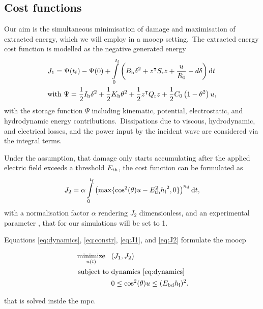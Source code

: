 \subsection{Cost functions}
Our aim is the simultaneous minimisation of damage and maximisation of extracted energy, which we will employ in a \ac{moocp} setting.\ 
The extracted energy cost function is modelled as the negative generated energy
\begin{equation}\label{eq:J1}
	\begin{split}
		& J_1 = \Psi(\tf)-\Psi(0) +\int_0^{\tf} \left(B_\mathrm{h}\delta^2 +z^\intercal S_\mathrm{r} z +\dfrac{u}{R_0} - d \delta\right) \text{d}t \\
		& \text{with}\ \Psi = \dfrac{1}{2}I_\mathrm{h}\delta^2+\dfrac{1}{2}K_\mathrm{h}{\theta}^2+ \dfrac{1}{2}z^\intercal Q_\mathrm{r} z + \dfrac{1}{2} C_0\left(1 - \theta^2 \right) u,
	\end{split}
\end{equation}
with the storage function $\Psi$ including kinematic, potential, electrostatic, and hydrodynamic energy contributions.\ 
Dissipations due to viscous, hydrodynamic, and electrical losses, and the power input by the incident wave are considered via the integral terms.\ 

Under the assumption, that damage only starts accumulating after the applied electric field exceeds a threshold $E_\mathrm{th}$, the cost function can be formulated as
\begin{equation}\label{eq:J2}
	J_2 = \alpha \int_0^{\tf} \left(\max \{ \cos^2(\theta)u-\Eth^2 {\hl}^2,0 \} \right)^{\nd} \text{d}t, 
\end{equation}
with a normalisation factor $\alpha$ rendering $J_2$ dimensionless, and an experimental parameter \nd, that for our simulations will be set to 1.\ 
\ 

Equations \eqref{eq:dynamics}, \eqref{eq:constr}, \eqref{eq:J1}, and \eqref{eq:J2} formulate the \ac{moocp}

\begin{problem}\label{prob:ocp}
	\begin{align}\label{eq:problem}
	\operatorname*{minimize}_{u(t)} \ \ \, &(J_1, J_2) \nonumber\\
	\ \text{subject to} \ &\text{dynamics}\ \eqref{eq:dynamics} \nonumber\\
	&0 \le \cos^2(\theta) u \le (E_\mathrm{bd} h_\mathrm{l})^2.
\end{align}
\end{problem}
that is solved inside the \ac{mpc}.